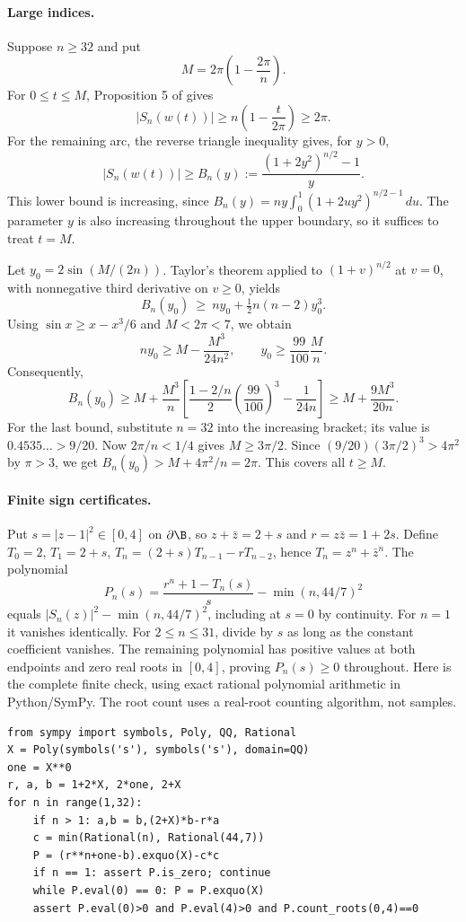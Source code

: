 \documentclass[11pt,a4paper]{article}
\numberwithin{equation}{section}
\theoremstyle{definition}
\theoremstyle{remark}
\begin{document}
\paragraph{Large indices.} Suppose \(n\ge32\) and put
\[
 M=2\pi\left(1-\frac{2\pi}{n}\right).
\]
For \(0\le t\le M\), Proposition 5 of \cite{r49reiwa:A} gives
\[
 |S_n(w(t))|\ge n\left(1-\frac{t}{2\pi}\right)\ge 2\pi .
\]
For the remaining arc, the reverse triangle inequality gives, for \(y>0\),
\[
 |S_n(w(t))|\ge B_n(y):=\frac{(1+2y^2)^{n/2}-1}{y}.
\]
This lower bound is increasing, since \(B_n(y)=ny\int_0^1(1+2uy^2)^{n/2-1}\,du\).
The parameter \(y\) is also increasing throughout the upper boundary, so it suffices to treat \(t=M\).

Let \(y_0=2\sin(M/(2n))\). Taylor's theorem applied to \((1+v)^{n/2}\) at \(v=0\), with nonnegative third derivative on \(v\ge0\), yields
\[
 B_n(y_0)\ \ge\ ny_0+\tfrac12n(n-2)y_0^3.
\]
Using \(\sin x\ge x-x^3/6\) and \(M<2\pi<7\), we obtain
\[
 ny_0\ge M-\frac{M^3}{24n^2},\qquad y_0\ge\frac{99}{100}\frac{M}{n}.
\]
Consequently,
\[
 B_n(y_0)\ge M+\frac{M^3}{n}
 \left[\frac{1-2/n}{2}\left(\frac{99}{100}\right)^3-\frac{1}{24n}\right]
 \ge M+\frac{9M^3}{20n}.
\]
For the last bound, substitute \(n=32\) into the increasing bracket; its value is \(0.4535\ldots>9/20\). Now \(2\pi/n<1/4\) gives \(M\ge3\pi/2\). Since \((9/20)(3\pi/2)^3>4\pi^2\) by \(\pi>3\), we get \(B_n(y_0)>M+4\pi^2/n=2\pi\). This covers all \(t\ge M\).

\paragraph{Finite sign certificates.} Put \(s=|z-1|^2\in[0,4]\) on \(\partial\B\), so \(z+\bar z=2+s\) and \(r=z\bar z=1+2s\). Define \(T_0=2\), \(T_1=2+s\), \(T_n=(2+s)T_{n-1}-rT_{n-2}\), hence \(T_n=z^n+\bar z^n\). The polynomial
\[
 P_n(s)=\frac{r^n+1-T_n(s)}s-\min(n,44/7)^2
\]
equals \(|S_n(z)|^2-\min(n,44/7)^2\), including at \(s=0\) by continuity. For \(n=1\) it vanishes identically. For \(2\le n\le31\), divide by \(s\) as long as the constant coefficient vanishes. The remaining polynomial has positive values at both endpoints and zero real roots in \([0,4]\), proving \(P_n(s)\ge0\) throughout. Here is the complete finite check, using exact rational polynomial arithmetic in Python/SymPy. The root count uses a real-root counting algorithm, not samples.
\begin{Verbatim}
from sympy import symbols, Poly, QQ, Rational
X = Poly(symbols('s'), symbols('s'), domain=QQ)
one = X**0
r, a, b = 1+2*X, 2*one, 2+X
for n in range(1,32):
    if n > 1: a,b = b,(2+X)*b-r*a
    c = min(Rational(n), Rational(44,7))
    P = (r**n+one-b).exquo(X)-c*c
    if n == 1: assert P.is_zero; continue
    while P.eval(0) == 0: P = P.exquo(X)
    assert P.eval(0)>0 and P.eval(4)>0 and P.count_roots(0,4)==0
\end{Verbatim}
\end{document}
